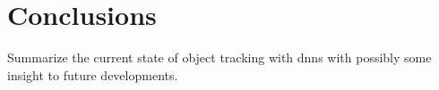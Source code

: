 \section{Conclusions}

Summarize the current state of object tracking with \ac{dnn}s with possibly some
insight to future developments.
